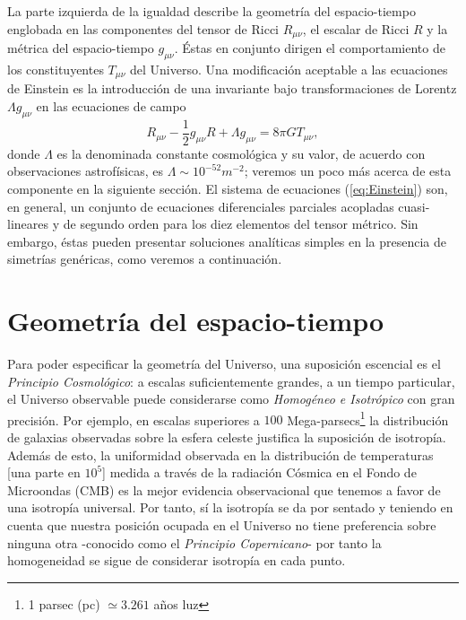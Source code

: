 \documentclass[10.5pt,prb,
               showpacs,            %
               preprintnumbers,     %
               aps,                 %
               prl,          	    %
               letterpaper,             %
               superscriptaddress,      %
               nofootinbib,         %
               tightenlines,        %
               floats,floatfix      %
               ,usenatbib]{revtex4-1}%
\def\beq{\begin{equation}}
\def\eeq{\end{equation}}
\begin{document}
 \noindent
La parte izquierda de la igualdad describe la geometr\'ia del espacio-tiempo englobada en las 
componentes del tensor de Ricci $R_{\mu \nu}$, el escalar de Ricci $R$ y la m\'etrica del espacio-tiempo
$g_{\mu \nu}$. \'Estas en conjunto dirigen el comportamiento de los constituyentes $T_{\mu \nu}$ del Universo.
Una modificaci\'on aceptable a las ecuaciones de Einstein es la introducci\'on de una  invariante
bajo transformaciones de Lorentz $\Lambda g_{\mu \nu}$ en las ecuaciones de campo
%
	\beq \label{eq:Einstein}
		R_{\mu \nu} - \frac{1}{2}g_{\mu \nu}R + \Lambda g_{\mu \nu}=  8\pi G T_{\mu \nu},
	\eeq
%
donde $\Lambda$ es la denominada constante cosmol\'ogica y su valor, de acuerdo con observaciones astrof\'isicas,
es $\Lambda \sim10^{-52} m^{-2}$; veremos un poco m\'as acerca de esta componente en la siguiente secci\'on.
El sistema de ecuaciones (\ref{eq:Einstein}) son, en general, un conjunto de ecuaciones diferenciales parciales acopladas 
cuasi-lineares y de segundo orden para los diez elementos del tensor m\'etrico. Sin embargo, \'estas pueden 
presentar soluciones anal\'iticas simples en la presencia de simetr\'ias gen\'ericas, como veremos a continuaci\'on.



\section{Geometr\'ia del espacio-tiempo}


Para poder especificar la geometr\'ia del Universo, una suposici\'on escencial es el \textit{Principio Cosmol\'ogico}:
a escalas suficientemente grandes, a un tiempo particular, el Universo observable 
puede considerarse como \textit{Homog\'eneo e Isotr\'opico} con gran precisi\'on.
Por ejemplo, en escalas superiores a $100$ Mega-parsecs\footnote[1]{1 parsec (pc) $\simeq 3.261$ a\~nos luz} 
la distribuci\'on de galaxias observadas sobre la esfera celeste justifica la suposici\'on de isotrop\'ia. 
%
Adem\'as de esto, la uniformidad
observada en la distribuci\'on de temperaturas [una parte en $10^5$] medida a trav\'es de la radiaci\'on C\'osmica en el Fondo de
Microondas (CMB) es la mejor evidencia observacional que tenemos a favor de una 
isotrop\'ia universal. Por tanto, s\'i la isotrop\'ia se da por sentado y teniendo en cuenta que nuestra
posici\'on ocupada en el Universo no tiene preferencia sobre ninguna otra -conocido como el \textit{Principio 
Copernicano}- por tanto la homogeneidad se sigue de considerar isotrop\'ia en cada punto.
 \\
 
\end{document}
